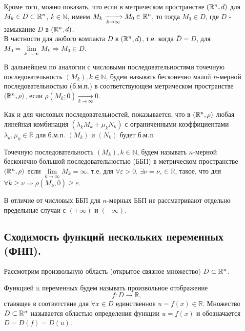 Кроме того, можно показать, что если в метрическом пространстве $(\mathbb{R}^n, d)$ для ${M_k \in D \subset \mathbb{R}^n}$, ${k \in \mathbb{N}}$,
имеем ${M_k \xrightarrow[k \to \infty]{} M_0 \in \mathbb{R}^n}$, то тогда $M_0 \in \overline{D}$, где $ \overline{D} $ - замыкание
$D$ в $(\mathbb{R}^n, d)$. \\
В частности для любого компакта $D$ в $(\mathbb{R}^n, d)$, т.е. когда $\overline{D} = D$,
для $M_0 = \lim\limits_{k \to \infty}M_k \Rightarrow M_0 \in D$.

\newpage

В дальнейшем по аналогии с числовыми последовательностями точечную последовательность $(M_k), k \in \mathbb{N}$, будем называть бесконечно малой $n$-мерной последовательностью (б.м.п.) в соответствующем
метрическом пространстве $(\mathbb{R}^n, \rho)$, если ${\rho(M_k; \overline{0}) \xrightarrow[k \to \infty]{} 0}$.

Как и для числовых последовательностей, показывается, что в $(\mathbb{R}^n, \rho)$ любая линейная комбинация
${(\lambda_kM_k + \mu_kN_k)}$ с ограниченными коэффициентами ${\lambda_k, \mu_k \in \mathbb{R}}$
для б.м.п. $(M_k)$ и $(N_k)$ будет б.м.п.

Точечную последовательность $(M_k), k \in \mathbb{N}$, будем называть $n$-мерной бесконечно
большой последовательностью (ББП) в метрическом пространстве $(\mathbb{R}^n, \rho)$ если $\lim\limits_{k \to \infty} M_k = \infty$, т.е. для ${\forall \varepsilon > 0}$, ${\exists \nu = \nu_{\varepsilon} \in \mathbb{R}}$,
такое, что для ${\forall k \geqslant \nu \Rightarrow \rho(M_k, \overline{0}) \geqslant \varepsilon}$.

В отличие от числовых ББП для $n$-мерных ББП не рассматривают отдельно предельные случаи с
$(+\infty)$ и $(-\infty)$.

\subsection{Сходимость функций нескольких переменных (ФНП).}

Рассмотрим произвольную область (открытое связное множество) $D \subset \mathbb{R}^n$.

Функцией n переменных будем называть произвольное отображение
\begin{equation}
\label{eq:f_n}
f : D \to \mathbb{R},
\end{equation}
ставящее в соответствие для $\forall x \in D$ единственное $u = f(x) \in \mathbb{R}$. Множество $D \subset \mathbb{R}^n$ называется областью определения функции $u = f(x)$ и обозначается $D = D(f) = D(u)$.


